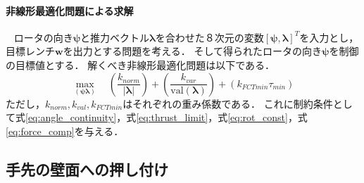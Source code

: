 \documentclass{jarticle}
\begin{document}
\paragraph{非線形最適化問題による求解}
~ ロータの向き$\bm{\psi}$と推力ベクトル$\bm{\lambda}$を合わせた８次元の変数$[\bm{\psi},\bm{\lambda}]^T$を入力とし，目標レンチ$\bm{w}$を出力とする問題を考える．
そして得られたロータの向き$\bm{\psi}$を制御の目標値とする．
解くべき非線形最適化問題は以下である．
\begin{equation}
    \max_{(\bm{\psi}\bm{\lambda})} \quad \left(\frac{k_{norm}}{|\bm{\lambda}|} \right) + \left(\frac{k_{var}}{\text{val}(\bm{\lambda})} \right) + \left(k_{FCTmin}\tau_{min} \right)
\end{equation}
ただし，$k_{norm},k_{val},k_{FCTmin}$はそれぞれの重み係数である．
これに制約条件として式\ref{eq:angle_continuity}，式\ref{eq:thrust_limit}，式\ref{eq:rot_const}，式\ref{eq:force_comp}を与える．

\subsection{手先の壁面への押し付け}
\end{document}
